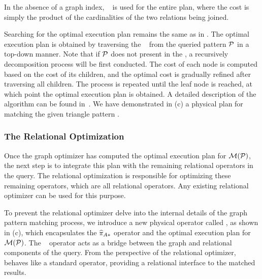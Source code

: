 In the absence of a graph index, \hashjoin~ is used for the entire plan, where the cost is simply the product of the cardinalities of the two relations being joined.

 Searching for the optimal execution plan remains the same as in \glogs. The optimal execution plan is obtained by traversing the \glogue~ from the queried pattern $\mathcal{P}$ in a top-down manner.
Note that if $\mathcal{P}$ does not present in the \glogue, a recursively decomposition process will be first conducted. The cost of each node is computed based on the cost of its children, and the optimal cost is gradually refined after traversing all children. The process is repeated until the leaf node is reached, at which point the optimal execution plan is obtained. A detailed description of the algorithm can be found in~\cite{GLogS}.
We have demonstrated in (c) a physical plan for matching the given triangle pattern
.


\subsubsection{The Relational Optimization}
Once the graph optimizer has computed the optimal execution plan for $\mathcal{M}(\mathcal{P})$, the next step is to integrate this plan with the remaining relational operators in the \spjm query. The relational optimization is responsible for optimizing these remaining operators, which are all relational operators. Any existing relational optimizer can be used for this purpose.


To prevent the relational optimizer delve into the internal details of the graph pattern matching process, we introduce a new physical operator called \scangraphtable, as shown in (c), which encapsulates the $\widehat{\pi}_{A*}$ operator and the optimal execution plan for $\mathcal{M}(\mathcal{P})$.
The \scangraphtable~ operator acts as a bridge between the graph and relational components of the query. From the perspective of the relational optimizer, \scangraphtable~ behaves like a standard \scan operator, providing a relational interface to the matched results. %

